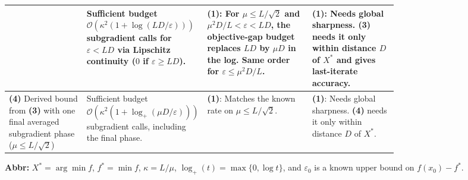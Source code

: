 \begin{table}[tp]
\begin{threeparttable}
\begin{tabularx}{\linewidth}{@{}>{\raggedright\arraybackslash}p{0.20\linewidth}>{\raggedright\arraybackslash}p{0.29\linewidth}>{\raggedright\arraybackslash}p{0.27\linewidth}>{\raggedright\arraybackslash}X@{}}
& Sufficient budget  $\mathcal{O}(\kappa^2(1+\log(LD/\varepsilon)))$ subgradient calls for $\varepsilon<LD$ via Lipschitz continuity ($0$ if $\varepsilon\ge LD$).
& \textbf{(1)}: For $\mu\le L/\sqrt{2}$ and $\mu^2D/L<\varepsilon<LD$, the objective-gap budget replaces $LD$ by $\mu D$ in the log. Same order for $\varepsilon\le\mu^2D/L$.
& \textbf{(1)}: Needs global sharpness. \textbf{(3)} needs it only within distance $D$ of $X^*$ and gives last-iterate accuracy. \\
\midrule
\textbf{(4)} Derived bound from \textbf{(3)} with one final averaged subgradient phase ($\mu\le L/\sqrt{2}$)
& Sufficient budget  $\mathcal{O}(\kappa^2(1+\log_+(\mu D/\varepsilon)))$ subgradient calls, including the final phase.
& \textbf{(1)}: Matches the known rate on $\mu\le L/\sqrt{2}$.
& \textbf{(1)}: Needs global sharpness. \textbf{(4)} needs it only within distance $D$ of $X^*$. \\
\bottomrule
\end{tabularx}
\begin{tablenotes}[flushleft]\footnotesize
\item[] \textbf{Abbr:} $X^*=\arg\min f$, $f^*=\min f$, $\kappa=L/\mu$, $\log_+(t)=\max\{0,\log t\}$, and $\varepsilon_0$ is a known upper bound on $f(x_0)-f^*$.
\end{tablenotes}
\end{threeparttable}
\end{table}
